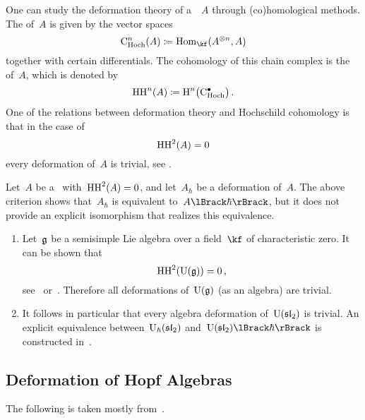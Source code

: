 \documentclass[a4paper, 11pt, oneside]{scrartcl}
\begin{document}
\begin{remark}
  One can study the deformation theory of a~\algebra{$\kf$}~$A$ through (co)homological methods.
  The  of~$A$ is given by the vector spaces
  \[
    \CHoch^n(A)
    \defined
    \Hom_{\kf}(A^{\tensor n}, A)
  \]
  together with certain differentials.
  The cohomology of this chain complex is the  of~$A$, which is denoted by
  \[
    \HH^n(A)
    \defined
    \Homology^n\bigl( \CHoch^\bullet \bigr) \,.
  \]
  One of the relations between deformation theory and Hochschild cohomology is that in the case of
  \[
    \operatorname{HH}^2(A) = 0
  \]
  every deformation of~$A$ is trivial, see \cite[Theorem~2]{gerstenhaber_quantum}.
\end{remark}

\begin{warning}
  Let~$A$ be a~\algebra{$\kf$} with~$\operatorname{HH}^2(A) = 0$, and let~$A_\hbar$ be a deformation of~$A$.
  The above criterion shows that~$A_\hbar$ is equivalent to~$\power{A}{\hbar}$, but it does not provide an explicit isomorphism that realizes this equivalence.
\end{warning}

\begin{example}
  \leavevmode
  \begin{enumerate}
    \item
      Let~$\mathfrak{g}$ be a semisimple Lie algebra over a field~$\kf$ of characteristic zero.
      It can be shown that
      \[
        \operatorname{HH}^2( \operatorname{U}(\mathfrak{g}) ) = 0 \,,
      \]
      see~\cite[Theorem~2]{gerstenhaber_quantum} or~\cite[Exercise~2.8.1,~Bonus]{schedler_nca}.
      Therefore all deformations of~$\operatorname{U}(\mathfrak{g})$ (as an algebra) are trivial.
    \item
      It follows in particular that every algebra deformation of~$\operatorname{U}(\mathfrak{sl}_2)$ is trivial.
      An explicit equivalence between~$\operatorname{U}_{\hbar}(\mathfrak{sl}_2)$ and~$\power{\Univ(\sllie_2)}{\hbar}$ is constructed in~\cite[Proposition~4.6.4]{guide_to_quantum_groups}.
  \end{enumerate}
\end{example}





\subsection{Deformation of Hopf Algebras}

The following is taken mostly from~\cite[Chapter~6]{guide_to_quantum_groups}.
\end{document}
